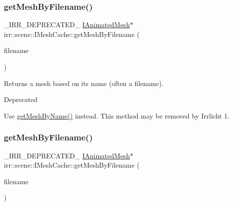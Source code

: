 \subsubsection{\texorpdfstring{get\+Mesh\+By\+Filename()}{getMeshByFilename()}\hspace{0.1cm}{\footnotesize\ttfamily [1/2]}}
{\footnotesize\ttfamily \+\_\+\+I\+R\+R\+\_\+\+D\+E\+P\+R\+E\+C\+A\+T\+E\+D\+\_\+ \hyperlink{classirr_1_1scene_1_1IAnimatedMesh}{I\+Animated\+Mesh}$\ast$ irr\+::scene\+::\+I\+Mesh\+Cache\+::get\+Mesh\+By\+Filename (\begin{DoxyParamCaption}\item[{const \hyperlink{namespaceirr_1_1io_a6468281622ce3a1c46b72e19f32dded5}{io\+::path} \&}]{filename }\end{DoxyParamCaption})\hspace{0.3cm}{\ttfamily [inline]}}



Returns a mesh based on its name (often a filename). 

\begin{DoxyRefDesc}{Deprecated}
\item[\hyperlink{deprecated__deprecated000009}{Deprecated}]Use \hyperlink{classirr_1_1scene_1_1IMeshCache_a4c93e736bdca8c84d478afc82540d6bb}{get\+Mesh\+By\+Name()} instead. This method may be removed by Irrlicht 1. \end{DoxyRefDesc}
\mbox{\label{classirr_1_1scene_1_1IMeshCache_aa3946324e39cc074b1f73e01d57cae70}} 
\subsubsection{\texorpdfstring{get\+Mesh\+By\+Filename()}{getMeshByFilename()}\hspace{0.1cm}{\footnotesize\ttfamily [2/2]}}
{\footnotesize\ttfamily \+\_\+\+I\+R\+R\+\_\+\+D\+E\+P\+R\+E\+C\+A\+T\+E\+D\+\_\+ \hyperlink{classirr_1_1scene_1_1IAnimatedMesh}{I\+Animated\+Mesh}$\ast$ irr\+::scene\+::\+I\+Mesh\+Cache\+::get\+Mesh\+By\+Filename (\begin{DoxyParamCaption}\item[{const \hyperlink{namespaceirr_1_1io_a6468281622ce3a1c46b72e19f32dded5}{io\+::path} \&}]{filename }\end{DoxyParamCaption})\hspace{0.3cm}{\ttfamily [inline]}}



